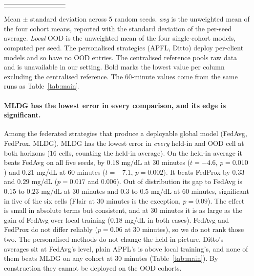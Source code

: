 \documentclass[10pt,letterpaper]{article}
\newlength\savedwidth
\newcommand\thickhline{\noalign{\global\savedwidth\arrayrulewidth\global\arrayrulewidth 2pt}%
\hline
\noalign{\global\arrayrulewidth\savedwidth}}
\begin{document}
\begin{table}[!ht]
{\begin{tabular}{lcccccccc}
\thickhline
\end{tabular}}
\begin{center}
{\small Mean $\pm$ standard deviation across 5 random seeds. \emph{avg} is the
unweighted mean of the four cohort means, reported with the standard deviation
of the per-seed average. \emph{Local} OOD is the unweighted mean of the four
single-cohort models, computed per seed. The personalised strategies (APFL,
Ditto) deploy per-client models and so have no OOD entries. The centralised
reference pools raw data and is unavailable in our setting. Bold marks the
lowest value per column excluding the centralised reference. The 60-minute
values come from the same runs as Table~\ref{tab:main}.}
\end{center}
\end{table}

\paragraph{MLDG has the lowest error in every comparison, and its edge is
significant.} Among the federated strategies that produce a deployable global
model (FedAvg, FedProx, MLDG), MLDG has the lowest error in \emph{every}
held-in and OOD cell at both horizons (16 cells, counting the held-in
average). On the held-in average it
beats FedAvg on all five seeds, by $0.18$ mg/dL at 30 minutes ($t = -4.6$,
$p = 0.010$) and $0.21$ mg/dL at 60 minutes ($t = -7.1$, $p = 0.002$). It
beats FedProx by $0.33$ and $0.29$ mg/dL ($p = 0.017$ and $0.006$). Out of
distribution its gap to FedAvg is $0.15$ to $0.23$ mg/dL at 30 minutes and
$0.3$ to $0.5$ mg/dL at 60 minutes, significant in five of the six cells
(Flair at 30 minutes is the exception, $p = 0.09$). The effect is small in
absolute terms but consistent, and at 30 minutes it is as large as the gain
of FedAvg over local training ($0.18$ mg/dL in both cases). FedAvg and FedProx
do not differ reliably ($p = 0.06$ at 30 minutes), so we do not rank those
two. The personalised methods do not change the held-in picture. Ditto's
averages sit at FedAvg's level, plain APFL's is above local training's, and
none of them beats MLDG on any cohort at 30 minutes (Table~\ref{tab:main}).
By construction they cannot be deployed on the OOD cohorts.
\end{document}
